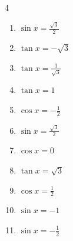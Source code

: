 \begin{multicols}{4}
\begin{enumerate}
  \item $\displaystyle \sin{x}  = \frac{\sqrt{3}}{2}$


  \item $\displaystyle \tan{x}  = -\sqrt{3}$


  \item $\displaystyle \tan{x}  = \frac{1}{\sqrt{3}}$


  \item $\displaystyle \tan{x}  = 1$


  \item $\displaystyle \cos{x}  = -\frac{1}{2}$


\columnbreak %

  \item $\displaystyle \sin{x}  = \frac{\sqrt{3}}{2}$


  \item $\displaystyle \cos{x}  = 0$


  \item $\displaystyle \tan{x}  = \sqrt{3}$


  \item $\displaystyle \cos{x}  = \frac{1}{2}$


  \item $\displaystyle \sin{x}  = -1$


  \item $\displaystyle \sin{x}  = -\frac{1}{2}$



\end{enumerate}
\end{multicols}
